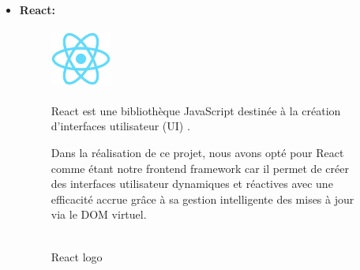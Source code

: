 \begin{itemize}
\begin{figure}[!htb]
\begin {minipage}{0.60\textwidth}
            \end{minipage}
        \end{figure}
        \item \textbf{React: }
            \begin{figure}[!htb]\centering
                \begin{minipage}{0.30\textwidth}
                \centering
                {\includegraphics[width = 2cm , height=2cm]{img/techno/react.png}}
                \caption{\\ React logo \cite{react}}\label{Fig:Data1}
                \end{minipage}
                \begin{minipage}{0.60\textwidth}
                    \par React est une bibliothèque JavaScript destinée à la création d'interfaces utilisateur (UI) \cite{react}. \\
                    \par Dans la réalisation de ce projet, nous avons opté pour React comme étant notre frontend framework car il  permet de créer des interfaces utilisateur dynamiques et réactives avec une efficacité accrue grâce à sa gestion intelligente des mises à jour via le DOM virtuel.
                \end{minipage}

            \end{figure}
    \end{itemize}

